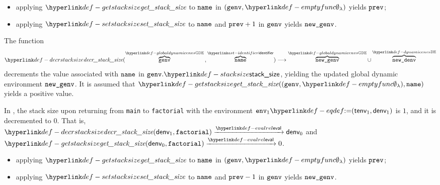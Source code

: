 \ProseParagraph
\AllApply
\begin{itemize}
  \item applying $\getstacksize$ to $\name$ in $(\genv, \emptyfunc)$ yields $\vprev$;
  \item applying $\setstacksize$ to $\name$ and $\vprev + 1$ in $\genv$ yields $\newgenv$.
\end{itemize}

\FormallyParagraph
\begin{mathpar}
\end{mathpar}

\hypertarget{def-decrstacksize}{}
The function
\[
\decrstacksize(\overname{\genv}{\globaldynamicenvs} \aslsep \overname{\name}{\identifier}) \aslto
\overname{\newgenv}{\globaldynamicenvs} \cup \overname{\newdenv}{\dynamicenvs}
\]
decrements the value associated with $\name$ in $\genv.\stacksize$, yielding the updated global dynamic environment $\newgenv$.
It is assumed that $\getstacksize((\genv, \emptyfunc), \name)$ yields a positive value.

In , the stack size upon returning from \verb|main| to \verb|factorial|
with the environment $\env_1 \eqdef (\tenv_1, \denv_1)$ is $1$, and it is decremented to $0$.
That is, \\
$\decrstacksize(\denv_1, \factorial) \evalarrow \denv_0$
and\\
$\getstacksize(\denv_0, \factorial) \evalarrow 0$.

\ProseParagraph
\AllApply
\begin{itemize}
  \item applying $\getstacksize$ to $\name$ in $(\genv, \emptyfunc)$ yields $\vprev$;
  \item applying $\setstacksize$ to $\name$ and $\vprev - 1$ in $\genv$ yields $\newgenv$.
\end{itemize}

\FormallyParagraph
\begin{mathpar}
\end{mathpar}

